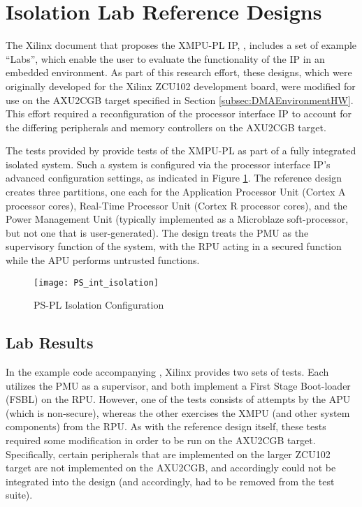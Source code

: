 \section{Isolation Lab Reference Designs}\label{sec:DMAIsolationLab}
The Xilinx document that proposes the XMPU-PL IP, \cite{noauthor_memory_2021}, includes a set of example ``Labs'', which enable the user to evaluate the functionality of the IP in an embedded environment. As part of this research effort, these designs, which were originally developed for the Xilinx ZCU102 development board, were modified for use on the AXU2CGB target specified in Section \ref{subsec:DMAEnvironmentHW}. This effort required a reconfiguration of the processor interface IP to account for the differing peripherals and memory controllers on the AXU2CGB target.

The tests provided by \cite{noauthor_memory_2021} provide tests of the XMPU-PL as part of a fully integrated isolated system. Such a system is configured via the processor interface IP's advanced configuration settings, as indicated in Figure \ref{fig:PS_int_isolation}. The reference design creates three partitions, one each for the Application Processor Unit (Cortex A processor cores), Real-Time Processor Unit (Cortex R processor cores), and the Power Management Unit (typically implemented as a Microblaze soft-processor, but not one that is user-generated). The design treats the PMU as the supervisory function of the system, with the RPU acting in a secured function while the APU performs untrusted functions.

\begin{figure}[h]
    \centering
    \texttt{[image: PS\_int\_isolation]}
    \caption{PS-PL Isolation Configuration}
    \label{fig:PS_int_isolation}
\end{figure}

\subsection{Lab Results}

In the example code accompanying \cite{noauthor_memory_2021}, Xilinx provides two sets of tests. Each utilizes the PMU as a supervisor, and both implement a First Stage Boot-loader (FSBL) on the RPU. However, one of the tests consists of attempts by the APU (which is non-secure), whereas the other exercises the XMPU (and other system components) from the RPU. As with the reference design itself, these tests required some modification in order to be run on the AXU2CGB target. Specifically, certain peripherals that are implemented on the larger ZCU102 target are not implemented on the AXU2CGB, and accordingly could not be integrated into the design (and accordingly, had to be removed from the test suite). 

